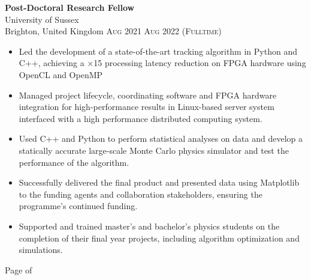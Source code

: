 \documentclass[oneside]{article}
\newcommand{\empitem}[7]{
        {\large \textbf{#1}} \\
        {{\fontseries{medium}\selectfont #2}}\\
        {{\fontseries{light}\selectfont #3}} \hfill
        {\scshape\fontseries{light}\selectfont\footnotesize #4 \textendash{} #5 (#6)} 
        #7
}
\begin{document}
{\begin{minipage}[t][\dimexpr\textheight-2\fboxrule-2\fboxsep\relax][t]{\dimexpr0.6\textwidth-2\fboxrule-2\fboxsep\relax}
{\begin{itemize}
        \end{itemize}
        }
%
        \empitem{Post-Doctoral Research Fellow}
        {University of Sussex}
        {Brighton, United Kingdom}
        {Aug 2021}
        {Aug 2022}
        {Fulltime}
        {
        \begin{itemize}
            \setlength{\itemsep}{-3pt}
            \item Led the development of a state-of-the-art tracking algorithm in Python and C++, achieving a ×15 processing latency reduction on FPGA hardware using OpenCL and OpenMP
            \item Managed project lifecycle, coordinating software and FPGA hardware integration for high-performance results in Linux-based server system interfaced with a high performance distributed computing system.
            \item Used C++ and Python to perform statistical analyses on data and develop a statically accurate large-scale Monte Carlo physics simulator and test the performance of the algorithm.
            \item Successfully delivered the final product and presented data using Matplotlib to the funding agents and collaboration stakeholders, ensuring the programme’s continued funding.
            \item Supported and trained master’s and bachelor’s physics students on the completion of their final year projects, including algorithm optimization and simulations.
        \end{itemize}
        }
        \vfill%
        {\hfill\small{}\selectfont Page \thepage of \pageref{LastPage}\hfill}
    \end{minipage}
}

\newpage
\end{document}

